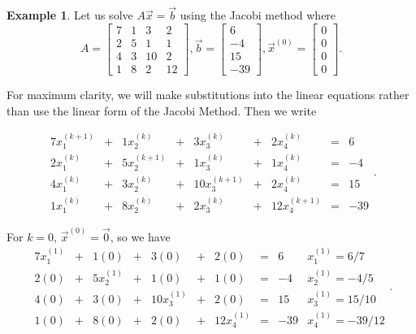 \documentclass[12pt,letterpaper]{article}
\theoremstyle{definition}
\newtheorem{example}[thm]{Example}
\begin{document}
\begin{example}
Let us solve $A\vec{x}=\vec{b}$ using the Jacobi method where 
\begin{equation}\label{sample_axb}
A=
    \begin{bmatrix}
    7 & 1 & 3 & 2\\
    2 & 5 & 1 & 1\\
    4 & 3 & 10 & 2\\
    1 & 8 & 2 & 12
    \end{bmatrix}, 
\vec{b}=
\begin{bmatrix}
6\\-4\\15\\-39
\end{bmatrix},
\vec{x}^{(0)} =
\begin{bmatrix}
0\\0\\0\\0
\end{bmatrix}.
\end{equation}

For maximum clarity, we will make substitutions into the linear equations rather than use the linear form of the Jacobi Method. Then we write

\begin{equation*}
    \begin{matrix}
    7x_1^{(k+1)} &+& 1x_2^{(k)} &+& 3x_3^{(k)} &+& 2x_4^{(k)} &=& 6\\
    2x_1^{(k)} &+& 5x_2^{(k+1)} &+& 1x_3^{(k)} &+& 1x_4^{(k)} &=& -4\\
    4x_1^{(k)} &+& 3x_2^{(k)} &+& 10x_3^{(k+1)} &+& 2x_4^{(k)} &=& 15\\
    1x_1^{(k)} &+& 8x_2^{(k)} &+& 2x_3^{(k)} &+& 12x_4^{(k+1)} &=& -39
    \end{matrix}.
\end{equation*}

For $k=0$, $\vec{x}^{(0)}=\vec{0}$, so we have
\begin{equation*}
    \begin{array}{ccccccccc|l}
    7x_1^{(1)} &+& 1(0) &+& 3(0) &+& 2(0) &=& 6& x_1^{(1)}=6/7 \\
    2(0) &+& 5x_2^{(1)} &+& 1(0) &+& 1(0) &=& -4&  x_2^{(1)}=-4/5\\
    4(0) &+& 3(0) &+& 10x_3^{(1)} &+& 2(0) &=& 15& x_3^{(1)}=15/10 \\
    1(0) &+& 8(0) &+& 2(0) &+& 12x_4^{(1)} &=& -39& x_4^{(1)}=-39/12
    \end{array}.
\end{equation*}


\end{example}
\end{document}
